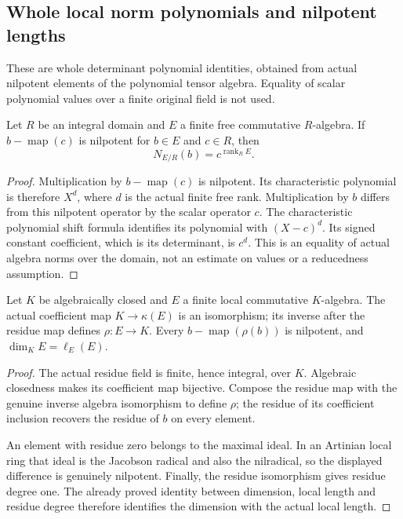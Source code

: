 \subsection{Whole local norm polynomials and nilpotent lengths}
\label{subsec:local-norm-polynomials}

These are whole determinant polynomial identities, obtained from actual
nilpotent elements of the polynomial tensor algebra. Equality of scalar
polynomial values over a finite original field is not used.

\begin{lemma}
\label{spectrum:nilpotent-scalar-determinant}
\leanok
Let $R$ be an integral domain and $E$ a finite free commutative $R$-algebra.
If $b-\operatorname{map}(c)$ is nilpotent for $b\in E$ and $c\in R$, then
\[
 N_{E/R}(b)=c^{\operatorname{rank}_R E}.
\]
\end{lemma}
\begin{proof}
Multiplication by $b-\operatorname{map}(c)$ is nilpotent. Its
characteristic polynomial is therefore $X^d$, where $d$ is the actual
finite free rank. Multiplication by $b$ differs from this nilpotent
operator by the scalar operator $c$. The characteristic polynomial
shift formula identifies its polynomial with $(X-c)^d$. Its signed
constant coefficient, which is its determinant, is $c^d$.
This is an equality of actual algebra norms over the domain, not an
estimate on values or a reducedness assumption.
\end{proof}

\begin{lemma}
\label{spectrum:algclosed-local-residue-scalar}
\leanok
{}
Let $K$ be algebraically closed and $E$ a finite local commutative
$K$-algebra. The actual coefficient map $K\to\kappa(E)$ is an isomorphism;
its inverse after the residue map defines $\rho:E\to K$. Every
$b-\operatorname{map}(\rho(b))$ is nilpotent, and
$\dim_K E=\ell_E(E)$.
\end{lemma}
\begin{proof}
The actual residue field is finite, hence integral, over $K$.
Algebraic closedness makes its coefficient map bijective. Compose the
residue map with the genuine inverse algebra isomorphism to define
$\rho$; the residue of its coefficient inclusion recovers the residue
of $b$ on every element.

An element with residue zero belongs to the maximal ideal. In an
Artinian local ring that ideal is the Jacobson radical and also the
nilradical, so the displayed difference is genuinely nilpotent.
Finally, the residue isomorphism gives residue degree one. The
already proved identity between dimension, local length and residue
degree therefore identifies the dimension with the actual local length.
\end{proof}

